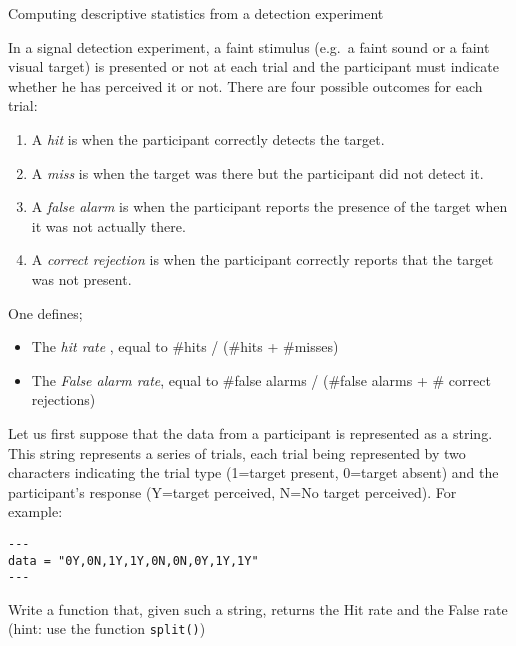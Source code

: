 \documentclass[11pt]{article}
\providecommand{\tightlist}{%
      \setlength{\itemsep}{0pt}\setlength{\parskip}{0pt}}
\begin{document}
    Computing descriptive statistics from a detection experiment

In a signal detection experiment, a faint stimulus (e.g.~a faint sound
or a faint visual target) is presented or not at each trial and the
participant must indicate whether he has perceived it or not. There are
four possible outcomes for each trial:

\begin{enumerate}
\def\labelenumi{\arabic{enumi}.}
\tightlist
\item
  A \emph{hit} is when the participant correctly detects the target.
\item
  A \emph{miss} is when the target was there but the participant did not
  detect it.
\item
  A \emph{false alarm} is when the participant reports the presence of
  the target when it was not actually there.
\item
  A \emph{correct rejection} is when the participant correctly reports
  that the target was not present.
\end{enumerate}

One defines;

\begin{itemize}
\tightlist
\item
  The \emph{hit rate} , equal to \#hits / (\#hits + \#misses)
\item
  The \emph{False alarm rate}, equal to \#false alarms / (\#false alarms
  + \# correct rejections)
\end{itemize}

Let us first suppose that the data from a participant is represented as
a string. This string represents a series of trials, each trial being
represented by two characters indicating the trial type (1=target
present, 0=target absent) and the participant's response (Y=target
perceived, N=No target perceived). For example:

\begin{verbatim}
---
data = "0Y,0N,1Y,1Y,0N,0N,0Y,1Y,1Y"
---
\end{verbatim}

Write a function that, given such a string, returns the Hit rate and the
False rate (hint: use the function \texttt{split()})
\end{document}

